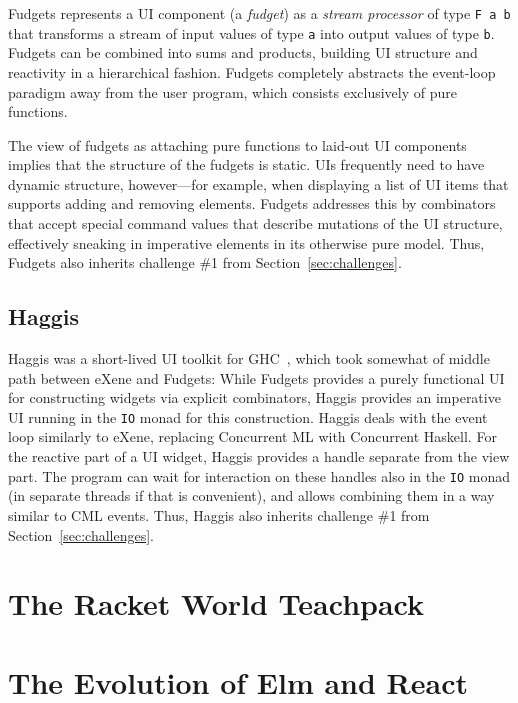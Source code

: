 \documentclass[sigplan,screen]{acmart}
\begin{document}
Fudgets represents a UI component (a \textit{fudget}) as a
\textit{stream processor} of type \verb|F a b| that transforms a
stream of input values of type \texttt{a} into output values of type
\texttt{b}.  Fudgets can be combined into sums and products, building
UI structure and reactivity in a hierarchical fashion.  Fudgets
completely abstracts the event-loop paradigm away from the user
program, which consists exclusively of pure functions.

The view of fudgets as attaching pure functions to laid-out UI
components implies that the structure of the fudgets is static.  UIs
frequently need to have dynamic structure, however---for example, when
displaying a list of UI items that supports adding and removing
elements.  Fudgets addresses this by combinators that accept special
command values that describe mutations of the UI structure,
effectively sneaking in imperative elements in its otherwise pure
model.  Thus, Fudgets also inherits challenge \#1 from
Section~\ref{sec:challenges}.

\subsection{Haggis}

Haggis was a short-lived UI toolkit for GHC~\cite{Haggis}, which took
somewhat of middle path between eXene and Fudgets: While Fudgets
provides a purely functional UI for constructing widgets via explicit
combinators, Haggis provides an imperative UI running in the
\texttt{IO} monad for this construction.  Haggis deals with the event
loop similarly to eXene, replacing Concurrent ML with Concurrent
Haskell.  For the reactive part of a UI widget, Haggis provides a
handle separate from the view part.  The program can wait for
interaction on these handles also in the \texttt{IO} monad (in
separate threads if that is convenient), and allows combining them in
a way similar to CML events.  Thus, Haggis also inherits challenge
\#1 from Section~\ref{sec:challenges}.

\section{The Racket World Teachpack}
\label{sec:world-teachpack}




\section{The Evolution of Elm and React}
\end{document}
